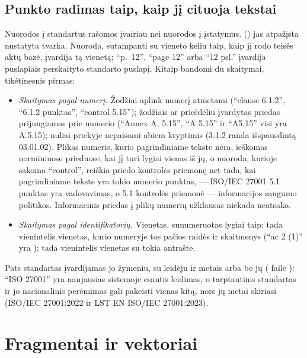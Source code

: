\subsection{Punkto radimas taip, kaip jį cituoja tekstai}\label{sec:corpus:clause}

Nuorodos į standartus rašomos įvairiau nei nuorodos į įstatymus. 
() jas atpažįsta nustatyta tvarka. Nuoroda, sutampanti su vieneto
keliu taip, kaip jį rodo teisės aktų bazė, įvardija tą vienetą; \enquote{p.~12},
\enquote{page 12} arba \enquote{12 psl.} įvardija puslapiais perskaityto standarto puslapį.
Kitaip bandomi du skaitymai, tikėtinesnis pirmas:

\begin{itemize}
  \item \emph{Skaitymas pagal numerį.} Žodžiai aplink numerį atmetami (\enquote{clause
    6.1.2}, \enquote{6.1.2 punktas}, \enquote{control 5.15}); žodžiais ar priešdėliu
    įvardytas priedas prijungiamas prie numerio (\enquote{Annex A, 5.15}, \enquote{A 5.15} ir
    \enquote{A5.15} visi yra A.5.15); nuliai priekyje nepaisomi abiem kryptimis (3.1.2 randa
    išspausdintą 03.01.02). Plikas numeris, kurio pagrindiniame tekste nėra, ieškomas
    norminiuose prieduose, kai jį turi lygiai vienas iš jų, o nuoroda, kurioje sakoma
    \enquote{control}, reiškia priedo kontrolės priemonę net tada, kai pagrindiniame tekste
    yra tokio numerio punktas, --- ISO/IEC 27001 5.1 punktas yra vadovavimas, o 5.1 kontrolės
    priemonė --- informacijos saugumo politikos. Informacinis priedas į plikų numerių
    užklausas niekada neatsako.
  \item \emph{Skaitymas pagal identifikatorių.} Vienetas, sunumeruotas lygiai taip; tada
    vienintelis vienetas, kurio numeryje tos pačios raidės ir skaitmenys (\enquote{ac 2 (1)}
    yra ); tada vienintelis vienetas su tokia antrašte.
\end{itemize}

Pats standartas įvardijamas jo žymeniu, su leidėju ir metais arba be jų
( faile ): \enquote{ISO 27001} yra naujausias
sistemoje esantis leidimas, o tarptautinis standartas ir jo nacionalinis perėmimas gali pakeisti
vienas kitą, nors jų metai skiriasi (ISO/IEC 27001:2022 ir LST EN ISO/IEC 27001:2023).


\section{Fragmentai ir vektoriai}\label{sec:corpus:chunks}

